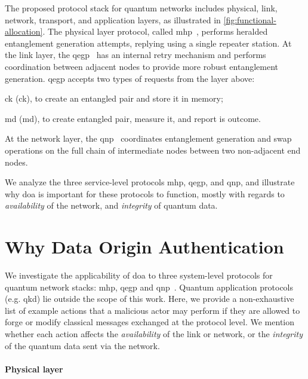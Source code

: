 The proposed protocol stack for quantum networks includes physical, link, network, transport, and
application layers, as illustrated in \cref{fig:functional-allocation}. The physical layer protocol,
called \acrfull{mhp}~\cite{dahlberg_2019_egp}, performs heralded entanglement generation attempts,
replying using a single repeater station. At the link layer, the
\acrfull{qegp}~\cite{dahlberg_2019_egp} has an internal retry mechanism and performs coordination
between adjacent nodes to provide more robust entanglement generation. \acrshort{qegp} accepts two
types of requests from the layer above:
%
\begin{inlinelist}
    \item \acrlong{ck} (\acrshort{ck}), to create an entangled pair and store it in memory;
    \item \acrlong{md} (\acrshort{md}), to create entangled pair, measure it, and report is outcome.
\end{inlinelist}
At the network layer, the \acrfull{qnp}~\cite{kozlowski_2020_qnp} coordinates entanglement
generation and swap operations on the full chain of intermediate nodes between two non-adjacent end
nodes.

We analyze the three service-level protocols \acrshort{mhp}, \acrshort{qegp}, and \acrshort{qnp},
and illustrate why \acrfull{doa} is important for these protocols to function, mostly with regards
to \emph{availability} of the network, and \emph{integrity} of quantum data.

\section{Why Data Origin Authentication}
\label{sec:doa:why}

We investigate the applicability of \acrlong{doa} to three system-level protocols for quantum
network stacks: \acrshort{mhp}, \acrshort{qegp} and \acrshort{qnp}~\cite{dahlberg_2019_egp,
kozlowski_2020_qnp}. Quantum application protocols (e.g. \acrshort{qkd}) lie outside the scope of
this work. Here, we provide a non-exhaustive list of example actions that a malicious actor may
perform if they are allowed to forge or modify classical messages exchanged at the protocol level.
We mention whether each action affects the \emph{availability} of the link or network, or the
\emph{integrity} of the quantum data sent via the network.

\paragraph{Physical layer}


